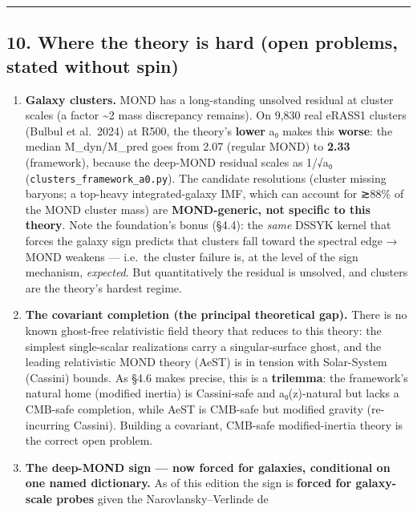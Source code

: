 \documentclass[
]{article}
\providecommand{\tightlist}{%
  \setlength{\itemsep}{0pt}\setlength{\parskip}{0pt}}
\begin{document}
\begin{center}\rule{0.5\linewidth}{0.5pt}\end{center}

\subsection{10. Where the theory is hard (open problems, stated without
spin)}\label{where-the-theory-is-hard-open-problems-stated-without-spin}

\begin{enumerate}
\def\labelenumi{\arabic{enumi}.}
\tightlist
\item
  \textbf{Galaxy clusters.} MOND has a long-standing unsolved residual
  at cluster scales (a factor \textasciitilde2 mass discrepancy
  remains). On 9,830 real eRASS1 clusters (Bulbul et al.~2024) at R500,
  the theory's \textbf{lower} a₀ makes this \textbf{worse}: the median
  M\_dyn/M\_pred goes from 2.07 (regular MOND) to \textbf{2.33}
  (framework), because the deep-MOND residual scales as 1/√a₀
  (\texttt{clusters\_framework\_a0.py}). The candidate resolutions
  (cluster missing baryons; a top-heavy integrated-galaxy IMF, which can
  account for ≳88\% of the MOND cluster mass) are \textbf{MOND-generic,
  not specific to this theory}. Note the foundation's bonus (§4.4): the
  \emph{same} DSSYK kernel that forces the galaxy sign predicts that
  clusters fall toward the spectral edge → MOND weakens --- i.e.~the
  cluster failure is, at the level of the sign mechanism,
  \emph{expected}. But quantitatively the residual is unsolved, and
  clusters are the theory's hardest regime.
\item
  \textbf{The covariant completion (the principal theoretical gap).}
  There is no known ghost-free relativistic field theory that reduces to
  this theory: the simplest single-scalar realizations carry a
  singular-surface ghost, and the leading relativistic MOND theory
  (AeST) is in tension with Solar-System (Cassini) bounds. As §4.6 makes
  precise, this is a \textbf{trilemma}: the framework's natural home
  (modified inertia) is Cassini-safe and a₀(z)-natural but lacks a
  CMB-safe completion, while AeST is CMB-safe but modified gravity
  (re-incurring Cassini). Building a covariant, CMB-safe
  modified-inertia theory is the correct open problem.
\item
  \textbf{The deep-MOND sign --- now forced for galaxies, conditional on
  one named dictionary.} As of this edition the sign is \textbf{forced
  for galaxy-scale probes} given the Narovlansky--Verlinde de

\end{enumerate}
\end{document}
